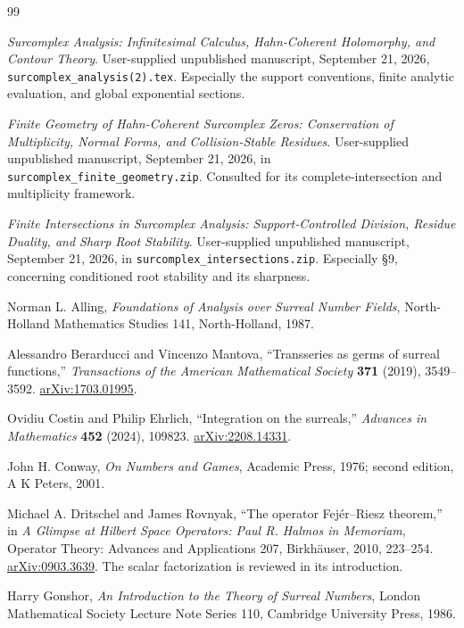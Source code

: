 \documentclass[11pt,letterpaper]{article}
\theoremstyle{definition}
\theoremstyle{remark}
\numberwithin{equation}{section}
\begin{document}
\begin{thebibliography}{99}

\emph{Surcomplex Analysis: Infinitesimal Calculus, Hahn-Coherent Holomorphy, and Contour Theory}.
User-supplied unpublished manuscript, September 21, 2026,
\texttt{surcomplex\_analysis(2).tex}. Especially the support conventions, finite analytic evaluation, and global exponential sections.

\emph{Finite Geometry of Hahn-Coherent Surcomplex Zeros: Conservation of Multiplicity, Normal Forms, and Collision-Stable Residues}.
User-supplied unpublished manuscript, September 21, 2026, in
\texttt{surcomplex\_finite\_geometry.zip}. Consulted for its complete-intersection and multiplicity framework.

\emph{Finite Intersections in Surcomplex Analysis: Support-Controlled Division, Residue Duality, and Sharp Root Stability}.
User-supplied unpublished manuscript, September 21, 2026, in
\texttt{surcomplex\_intersections.zip}. Especially \S9, concerning conditioned root stability and its sharpness.

Norman L. Alling,
\emph{Foundations of Analysis over Surreal Number Fields},
North-Holland Mathematics Studies 141, North-Holland, 1987.

Alessandro Berarducci and Vincenzo Mantova,
``Transseries as germs of surreal functions,''
\emph{Transactions of the American Mathematical Society} \textbf{371} (2019), 3549--3592.
\href{https://arxiv.org/abs/1703.01995}{arXiv:1703.01995}.

Ovidiu Costin and Philip Ehrlich,
``Integration on the surreals,''
\emph{Advances in Mathematics} \textbf{452} (2024), 109823.
\href{https://arxiv.org/abs/2208.14331}{arXiv:2208.14331}.

John H. Conway,
\emph{On Numbers and Games}, Academic Press, 1976; second edition, A K Peters, 2001.

Michael A. Dritschel and James Rovnyak,
``The operator Fej\'er--Riesz theorem,''
in \emph{A Glimpse at Hilbert Space Operators: Paul R. Halmos in Memoriam},
Operator Theory: Advances and Applications 207, Birkh\"auser, 2010, 223--254.
\href{https://arxiv.org/abs/0903.3639}{arXiv:0903.3639}.
The scalar factorization is reviewed in its introduction.

Harry Gonshor,
\emph{An Introduction to the Theory of Surreal Numbers},
London Mathematical Society Lecture Note Series 110, Cambridge University Press, 1986.


\end{thebibliography}
\end{document}
